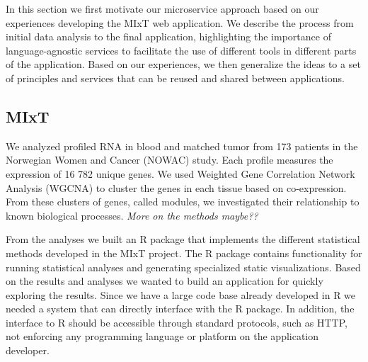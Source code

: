 In this section we first motivate our microservice approach based on our
experiences developing the MIxT web application.
We describe the process from initial data analysis to the final application,
highlighting the importance
of language-agnostic services to facilitate the use of different tools in
different parts of the application. 
Based on our experiences, we then generalize the ideas to a set
of principles and services that can be reused and shared between applications. 




\subsection*{MIxT} 
We analyzed profiled RNA in blood and matched tumor from 173 patients in the
Norwegian Women and Cancer (NOWAC) study. Each profile measures the expression
of 16 782 unique genes. We used Weighted Gene Correlation Network Analysis
(WGCNA)\cite{langfelder2008wgcna} to cluster the genes in each tissue
based on co-expression. From these clusters of genes, called modules, we
investigated their relationship to known biological processes.
\emph{More on the methods maybe??}

From the analyses we built an R package\cite{mixt-r-package} that
implements the different statistical methods developed in the MIxT project. 
The R package contains functionality for running statistical analyses and
generating specialized static visualizations. Based on the results and analyses
we wanted to build an application for quickly exploring the results. Since we
have a large code base already developed in R we needed a system that can
directly interface with the R package. 
In addition, the interface to R should be accessible through standard protocols,
such as HTTP, not enforcing any programming language or platform on the
application developer. 

